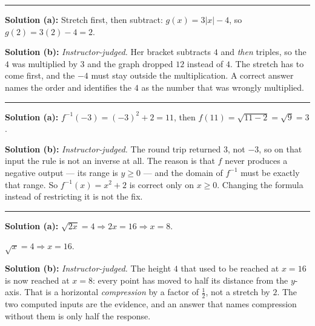 \documentclass[12pt]{article}
\begin{document}
\vspace{0.1cm}\noindent\rule{\linewidth}{0.2pt}


\textbf{Solution (a):} Stretch first, then subtract: $g(x) = 3|x| - 4$, so $g(2) = 3(2) - 4 = 2$. 

\textbf{Solution (b):} \emph{Instructor-judged.} Her bracket subtracts $4$ and \emph{then} triples, so the $4$ was multiplied by $3$ and the graph dropped $12$ instead of $4$. The stretch has to come first, and the $-4$ must stay outside the multiplication. A correct answer names the order and identifies the $4$ as the number that was wrongly multiplied.

\vspace{0.1cm}\noindent\rule{\linewidth}{0.2pt}


\textbf{Solution (a):} $f^{-1}(-3) = (-3)^{2} + 2 = 11$, then $f(11) = \sqrt{11 - 2} = \sqrt{9} = 3$. 

\textbf{Solution (b):} \emph{Instructor-judged.} The round trip returned $3$, not $-3$, so on that input the rule is not an inverse at all. The reason is that $f$ never produces a negative output --- its range is $y \geq 0$ --- and the domain of $f^{-1}$ must be exactly that range. So $f^{-1}(x) = x^{2} + 2$ is correct only on $x \geq 0$. Changing the formula instead of restricting it is not the fix.

\vspace{0.1cm}\noindent\rule{\linewidth}{0.2pt}


\textbf{Solution (a):} $\sqrt{2x} = 4 \Rightarrow 2x = 16 \Rightarrow x = 8$. 

\noindent $\sqrt{x} = 4 \Rightarrow x = 16$. 

\textbf{Solution (b):} \emph{Instructor-judged.} The height $4$ that used to be reached at $x = 16$ is now reached at $x = 8$: every point has moved to half its distance from the $y$-axis. That is a horizontal \emph{compression} by a factor of $\tfrac{1}{2}$, not a stretch by $2$. The two computed inputs are the evidence, and an answer that names compression without them is only half the response.
\end{document}
